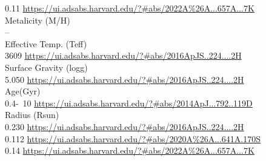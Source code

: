 0.11 \url{https://ui.adsabs.harvard.edu/?#abs/2022A%26A...657A...7K}\\
Metalicity (M/H)\\
--\\
Effective Temp. (Teff)\\
3609 \url{https://ui.adsabs.harvard.edu/?#abs/2016ApJS..224....2H}\\
Surface Gravity (logg)\\
5.050 \url{https://ui.adsabs.harvard.edu/?#abs/2016ApJS..224....2H}\\
Age(Gyr)\\
0.4-~10 \url{https://ui.adsabs.harvard.edu/?#abs/2014ApJ...792..119D}\\
Radius (Rsun)\\
0.230 \url{https://ui.adsabs.harvard.edu/?#abs/2016ApJS..224....2H}\\
0.112 \url{https://ui.adsabs.harvard.edu/?#abs/2020A%26A...641A.170S}\\
0.14 \url{https://ui.adsabs.harvard.edu/?#abs/2022A%26A...657A...7K}\\